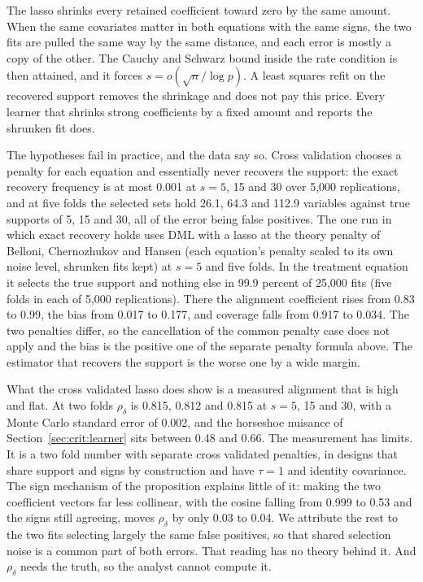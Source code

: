 The lasso shrinks every retained coefficient toward zero by the same amount. When the same covariates matter in both equations with the same signs, the two fits are pulled the same way by the same distance, and each error is mostly a copy of the other. The Cauchy and Schwarz bound inside the rate condition is then attained, and it forces $s = o(\sqrt n/\log p)$. A least squares refit on the recovered support removes the shrinkage and does not pay this price. Every learner that shrinks strong coefficients by a fixed amount and reports the shrunken fit does.

The hypotheses fail in practice, and the data say so. Cross validation chooses a penalty for each equation and essentially never recovers the support: the exact recovery frequency is at most 0.001 at $s = 5$, 15 and 30 over 5,000 replications, and at five folds the selected sets hold 26.1, 64.3 and 112.9 variables against true supports of 5, 15 and 30, all of the error being false positives. The one run in which exact recovery holds uses DML with a lasso at the theory penalty of Belloni, Chernozhukov and Hansen (each equation's penalty scaled to its own noise level, shrunken fits kept) at $s = 5$ and five folds. In the treatment equation it selects the true support and nothing else in 99.9 percent of 25,000 fits (five folds in each of 5,000 replications). There the alignment coefficient rises from 0.83 to 0.99, the bias from 0.017 to 0.177, and coverage falls from 0.917 to 0.034. The two penalties differ, so the cancellation of the common penalty case does not apply and the bias is the positive one of the separate penalty formula above. The estimator that recovers the support is the worse one by a wide margin.

What the cross validated lasso does show is a measured alignment that is high and flat. At two folds $\rho_\delta$ is 0.815, 0.812 and 0.815 at $s = 5$, 15 and 30, with a Monte Carlo standard error of 0.002, and the horseshoe nuisance of Section~\ref{sec:crit:learner} sits between 0.48 and 0.66. The measurement has limits. It is a two fold number with separate cross validated penalties, in designs that share support and signs by construction and have $\tau = 1$ and identity covariance. The sign mechanism of the proposition explains little of it: making the two coefficient vectors far less collinear, with the cosine falling from 0.999 to 0.53 and the signs still agreeing, moves $\rho_\delta$ by only 0.03 to 0.04. We attribute the rest to the two fits selecting largely the same false positives, so that shared selection noise is a common part of both errors. That reading has no theory behind it. And $\rho_\delta$ needs the truth, so the analyst cannot compute it.


